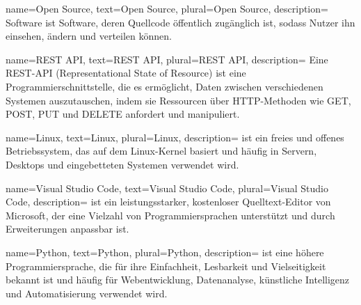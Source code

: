 %

{
  name={Open Source}, %
  text={Open Source}, %
  plural={Open Source}, %
  description=
    {
        Software ist Software, deren Quellcode öffentlich zugänglich ist, sodass Nutzer ihn einsehen, ändern und verteilen können.
    }
}

{
  name={REST API}, %
  text={REST API}, %
  plural={REST API}, %
  description=
    {
        Eine REST-API (Representational State of Resource) ist eine Programmierschnittstelle, die es ermöglicht, Daten zwischen verschiedenen Systemen auszutauschen, indem sie Ressourcen über HTTP-Methoden wie GET, POST, PUT und DELETE anfordert und manipuliert.
    }
}

{
  name={Linux}, %
  text={Linux}, %
  plural={Linux}, %
  description=
    {
        ist ein freies und offenes Betriebssystem, das auf dem Linux-Kernel basiert und häufig in Servern, Desktops und eingebetteten Systemen verwendet wird.
    }
}

{
  name={Visual Studio Code}, %
  text={Visual Studio Code}, %
  plural={Visual Studio Code}, %
  description=
    {
        ist ein leistungsstarker, kostenloser Quelltext-Editor von Microsoft, der eine Vielzahl von Programmiersprachen unterstützt und durch Erweiterungen anpassbar ist.
    }
}

{
  name={Python}, %
  text={Python}, %
  plural={Python}, %
  description=
    {
        ist eine höhere Programmiersprache, die für ihre Einfachheit, Lesbarkeit und Vielseitigkeit bekannt ist und häufig für Webentwicklung, Datenanalyse, künstliche Intelligenz und Automatisierung verwendet wird.
    }
}

